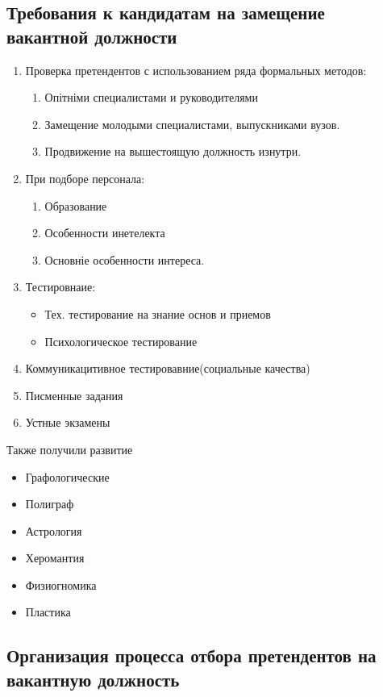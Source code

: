 \documentclass[a4paper,12pt,oneside,final]{extarticle}
\numberwithin{equation}{section}
\begin{document}
\subsection{Требования к кандидатам на замещение вакантной должности}
\begin{enumerate}
	\item Проверка претендентов с использованием ряда формальных методов:
	\begin{enumerate}
		\item Опітніми специалистами и руководителями 
		\item Замещение молодыми специалистами, выпускниками вузов.
		\item Продвижение на вышестоящую должность изнутри.
	\end{enumerate}

	\item При подборе персонала:
	\begin{enumerate}
		\item Образование
		\item Особенности инетелекта
		\item Основніе особенности интереса.
	\end{enumerate}

	\item Тестировнаие:
	\begin{itemize}
		\item Тех. тестирование на знание основ и приемов
		\item Психологическое тестирование 
	\end{itemize}
	
	\item Коммуникацитивное тестировавние(социальные качества)
	\item Писменные задания
	\item Устные экзамены
\end{enumerate}
Также получили развитие
\begin{itemize}
	\item Графологические
	\item Полиграф
	\item Астрология
	\item Херомантия
	\item Физиогномика
	\item Пластика
\end{itemize}

\subsection{Организация процесса отбора претендентов на вакантную должность}
\end{document}
